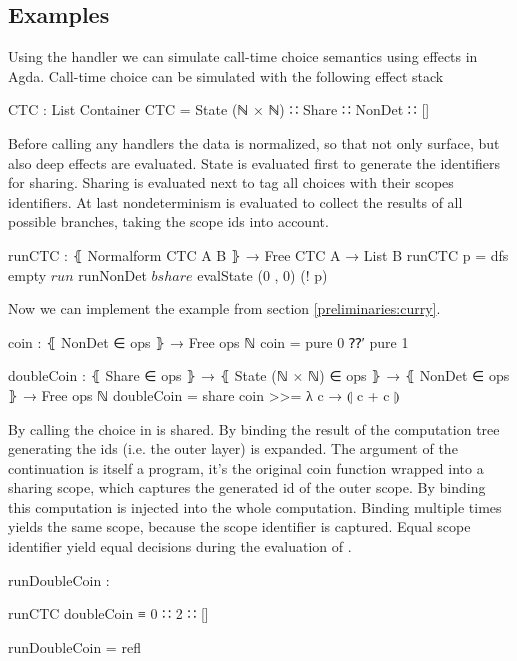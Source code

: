 \subsection{Examples}

Using the handler we can simulate call-time choice semantics using effects in
Agda.
Call-time choice can be simulated with the following effect stack

\begin{code}
CTC : List Container
CTC = State (ℕ × ℕ) ∷ Share ∷ NonDet ∷ []
\end{code}
Before calling any handlers the data is normalized, so that not only surface,
but also deep effects are evaluated.
State is evaluated first to generate the identifiers for sharing.
Sharing is evaluated next to tag all choices with their scopes identifiers.
At last nondeterminism is evaluated to collect the results of all possible
branches, taking the scope ids into account.

\begin{code}
runCTC : ⦃ Normalform CTC A B ⦄ → Free CTC A → List B
runCTC p = dfs empty $ run $ runNonDet $ bshare $ evalState (0 , 0) (! p)
\end{code}
Now we can implement the  example from section
\ref{preliminaries:curry}.

\begin{code}
coin : ⦃ NonDet ∈ ops ⦄ → Free ops ℕ
coin = pure 0 ⁇′ pure 1

doubleCoin : ⦃ Share ∈ ops ⦄ → ⦃ State (ℕ × ℕ) ∈ ops ⦄ → ⦃ NonDet ∈ ops ⦄ →
  Free ops ℕ
doubleCoin = share coin >>= λ c → ⦇ c + c ⦈
\end{code}
By calling  the choice in  is shared.
By binding the result of  the computation tree generating
the ids (i.e. the outer layer) is expanded.
The argument of the continuation  is itself a program, it's the
original coin function wrapped into a sharing scope, which captures the
generated id of the outer scope.
By binding  this computation is injected into the whole
computation.
Binding  multiple times yields the same scope, because the scope
identifier is captured.
Equal scope identifier yield equal decisions during the evaluation of
.

\begin{center}
\begin{code}
runDoubleCoin :
\end{code}
\begin{code}[inline]
 runCTC doubleCoin ≡ 0 ∷ 2 ∷ []
\end{code}
\begin{code}
runDoubleCoin = refl
\end{code}
\end{center}


